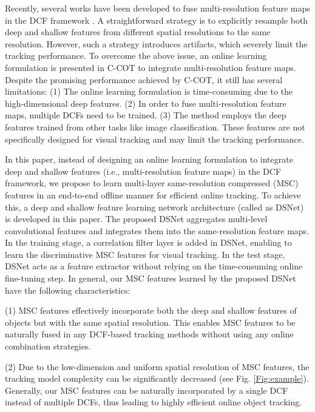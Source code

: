 \documentclass[runningheads]{llncs}
\begin{document}
Recently, several works have been developed to fuse multi-resolution feature maps in the DCF framework \cite{ECO,CCOT}. A straightforward strategy is to explicitly resample both deep and shallow features from different spatial resolutions to the same resolution. However, such a strategy introduces artifacts, which severely limit the tracking performance. To overcome the above issue, an online learning formulation is presented in C-COT \cite{CCOT} to integrate multi-resolution feature maps. Despite the promising performance achieved by C-COT, it still has several limitations: (1) The online learning formulation is time-consuming due to the high-dimensional deep features. (2) In order to fuse multi-resolution feature maps, multiple DCFs need to be trained. (3) The method employs the deep features trained from other tasks like image classification. These features are not specifically designed for visual tracking and may limit the tracking performance. 

In this paper, instead of designing an online learning formulation to integrate deep and shallow features (i.e., multi-resolution feature maps) in the DCF framework, we propose to learn multi-layer same-resolution compressed (MSC) features in an end-to-end offline manner for efficient online tracking. To achieve this, a deep and shallow feature learning network architecture (called as DSNet) is developed in this paper. The proposed DSNet aggregates multi-level convolutional features and integrates them into the same-resolution feature maps. In the training stage, a correlation filter layer is added in DSNet, enabling to learn the discriminative MSC features for visual tracking. In the test stage, DSNet acts as a feature extractor without relying on the time-consuming online fine-tuning step. In general, our MSC features learned by the proposed DSNet have the following characteristics: 

(1) MSC features effectively incorporate both the deep and shallow features of objects but with the same spatial resolution. This enables MSC features to be naturally fused in any DCF-based tracking methods without using any online combination strategies.

(2) Due to the low-dimension and uniform spatial resolution of MSC features, the tracking model complexity can be significantly decreased (see Fig. \ref{Fig:example}). Generally, our MSC features can be naturally incorporated by a single DCF instead of multiple DCFs, thus leading to highly efficient online object tracking.
\end{document}
